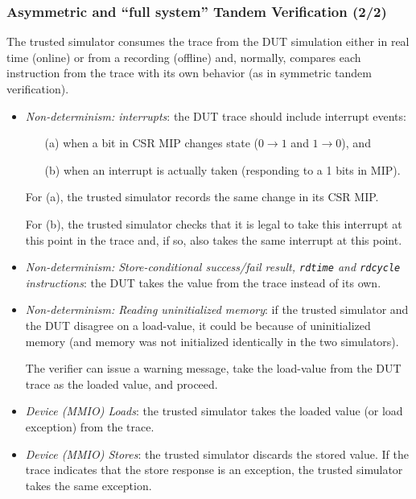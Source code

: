 \begin{frame}[fragile]
\frametitle{Asymmetric and ``full system'' Tandem Verification (2/2)}

\footnotesize

The trusted simulator consumes the trace from the DUT simulation
either in real time (online) or from a recording (offline) and,
normally, compares each instruction from the trace with its own
behavior (as in symmetric tandem verification).

\begin{itemize}

  \item \emph{Non-determinism: interrupts}: the DUT trace should
      include interrupt events:
      \begin{itemize}\scriptsize

        \item[(a)] when a bit in CSR MIP changes state ($0 \rightarrow
            1$ and $1 \rightarrow 0$), and

        \item[(b)] when an interrupt is actually taken (responding to a 1 bits in MIP).

      \end{itemize}

      For (a), the trusted simulator records the same change in its
      CSR MIP.

      For (b), the trusted simulator checks that it is legal to take
      this interrupt at this point in the trace and, if so, also takes
      the same interrupt at this point.

  \item \emph{Non-determinism: Store-conditional success/fail result,
      {\tt rdtime} and {\tt rdcycle} instructions}: the DUT takes the
      value from the trace instead of its own.

  \item \emph{Non-determinism: Reading uninitialized memory}:
      if the trusted simulator and the DUT disagree on a load-value,
      it could be because of uninitialized memory (and memory was not
      initialized identically in the two simulators).

      The verifier can issue a warning message, take the load-value
      from the DUT trace as the loaded value, and proceed.

  \item \emph{Device (MMIO) Loads}: the trusted simulator takes the
      loaded value (or load exception) from the trace.

  \item \emph{Device (MMIO) Stores}: the trusted simulator discards
      the stored value.  If the trace indicates that the store
      response is an exception, the trusted simulator takes the same
      exception.

\end{itemize}

\end{frame}


